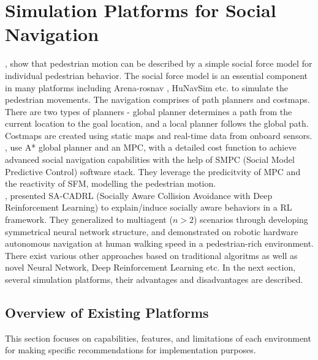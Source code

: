 \section{Simulation Platforms for Social Navigation}
\cite{Helbing_1995}, show that pedestrian motion can be described by a simple 
social force model for individual pedestrian behavior. The social force model is an essential 
component in many platforms including Arena-rosnav \cite{arenabench}, HuNavSim \cite{hunavsimros2human}
etc. to simulate the pedestrian movements. 
The navigation comprises of path planners and costmaps. There are two types of planners - global 
planner determines a path from the current location to the goal location, and a local planner 
follows the global path. Costmaps are created using static maps and real-time data from onboard
sensors. \\

\cite{MPCwithsfm}, use A* global planner and an MPC, with a detailed cost 
function to achieve advanced social navigation capabilities with the help of SMPC (Social 
Model Predictive Control) software stack. They leverage the predicitvity of MPC and the 
reactivity of SFM, modelling the pedestrian motion.\\

\cite{chen2018sociallyawaremotionplanning}, presented SA-CADRL (Socially Aware Collision 
Avoidance with Deep Reinforcement Learning) to explain/induce socially aware behaviors in a RL 
framework. They generalized to multiagent ($n > 2$) scenarios through developing symmetrical neural
network structure, and demonstrated on robotic hardware autonomous navigation at human walking 
speed in a pedestrian-rich environment. \\

There exist various other approaches based on traditional algoritms as well as novel 
Neural Network, Deep Reinforcement Learning etc. In the next section, several simulation platforms,
their advantages and disadvantages are described. 


\subsection{Overview of Existing Platforms}
This section focuses on capabilities, features, and limitations of each environment for 
making specific recommendations for implementation purposes. \\

